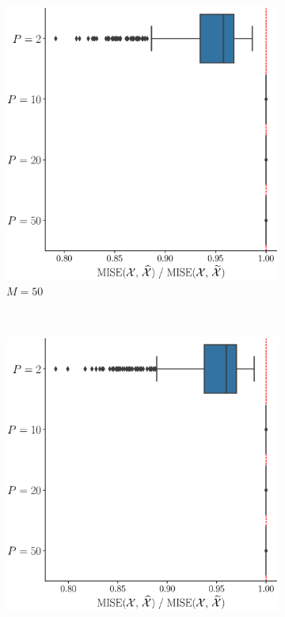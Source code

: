 \begin{results}
\begin{figure}
\begin{subfigure}[b]{0.49\textwidth}
         \includegraphics[width=\textwidth]{figures/scenario_1/mise_N50_M50.eps}
         \caption{$M = 50$}
         \label{fig:mise_mfd_1d_50}
     \end{subfigure}
     \\
     \begin{subfigure}[b]{0.49\textwidth}
         \centering
         \includegraphics[width=\textwidth]{figures/scenario_1/mise_N50_M75.eps}

\end{subfigure}
\end{figure}
\end{results}
